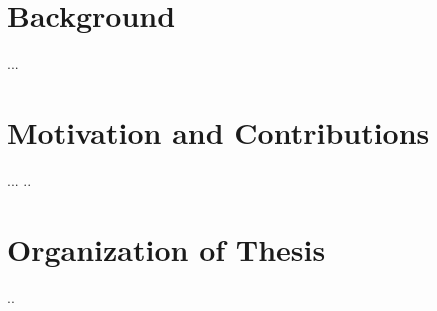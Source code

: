 \section{Background}
\label{sec:Intro}
...
\section{Motivation and Contributions}
...
..
\newpage
\section{Organization of Thesis}
..